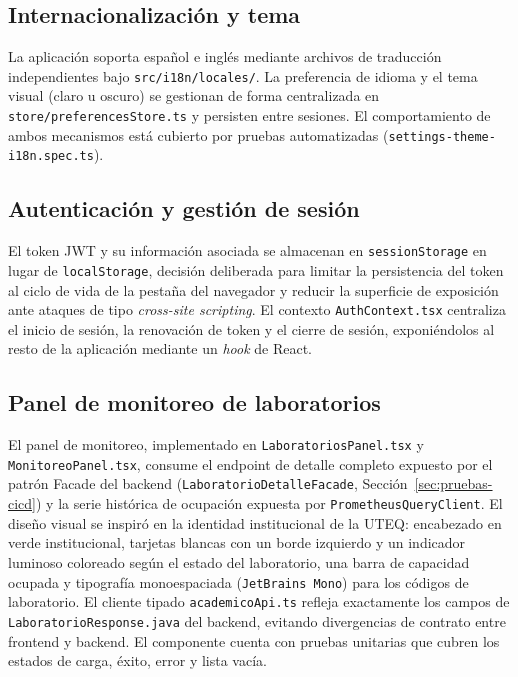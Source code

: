 \subsection{Internacionalización y tema}

La aplicación soporta español e inglés mediante archivos de traducción
independientes bajo \texttt{src/i18n/locales/}. La preferencia de
idioma y el tema visual (claro u oscuro) se gestionan de forma
centralizada en \texttt{store/preferencesStore.ts} y persisten entre
sesiones. El comportamiento de ambos mecanismos está cubierto por
pruebas automatizadas (\texttt{settings-theme-i18n.spec.ts}).

\subsection{Autenticación y gestión de sesión}

El token JWT y su información asociada se almacenan en
\texttt{sessionStorage} en lugar de \texttt{localStorage}, decisión
deliberada para limitar la persistencia del token al ciclo de vida de
la pestaña del navegador y reducir la superficie de exposición ante
ataques de tipo \emph{cross-site scripting}. El contexto
\texttt{AuthContext.tsx} centraliza el inicio de sesión, la renovación
de token y el cierre de sesión, exponiéndolos al resto de la
aplicación mediante un \emph{hook} de React.

\subsection{Panel de monitoreo de laboratorios}

El panel de monitoreo, implementado en
\texttt{LaboratoriosPanel.tsx} y \texttt{MonitoreoPanel.tsx}, consume
el endpoint de detalle completo expuesto por el patrón Facade del
backend (\texttt{LaboratorioDetalleFacade}, Sección~\ref{sec:pruebas-cicd})
y la serie histórica de ocupación expuesta por
\texttt{PrometheusQueryClient}. El diseño visual se inspiró en la
identidad institucional de la UTEQ: encabezado en verde institucional,
tarjetas blancas con un borde izquierdo y un indicador luminoso
coloreado según el estado del laboratorio, una barra de capacidad
ocupada y tipografía monoespaciada (\texttt{JetBrains Mono}) para los
códigos de laboratorio. El cliente tipado \texttt{academicoApi.ts}
refleja exactamente los campos de \texttt{LaboratorioResponse.java}
del backend, evitando divergencias de contrato entre frontend y
backend. El componente cuenta con pruebas unitarias que cubren los
estados de carga, éxito, error y lista vacía.

